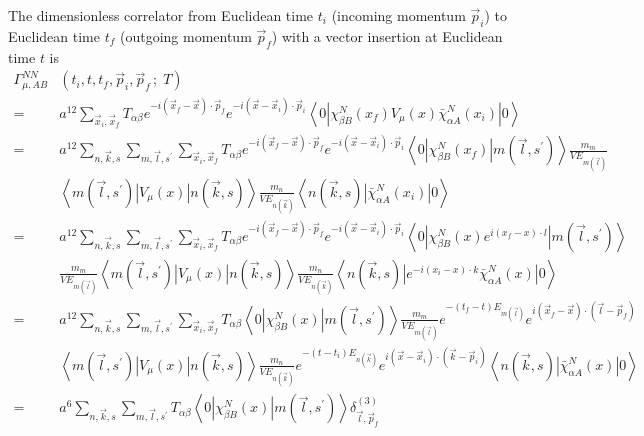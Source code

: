 \documentclass[12pt]{article}
\begin{document}
The dimensionless correlator from Euclidean time $t_i$ (incoming momentum
${\vec p}_i$) to Euclidean time $t_f$ (outgoing momentum $\vec{p}_f$) with a
vector insertion at Euclidean time $t$ is
\[
\begin{split}
\Gamma^{NN}_{\mu,AB}&(t_i,t,t_f,\vec{p}_i,\vec{p}_f\,;\;T) \\
  =\ & a^{12}\sum_{\vec{x}_i,\vec{x}_f} T_{\alpha\beta} 
     e^{-i(\vec{x}_f-\vec{x})\cdot\vec{p}_f}
     e^{-i(\vec{x}-\vec{x}_i)\cdot\vec{p}_i}
     \left<0\left|\chi^N_{\beta B}(x_f)V_\mu(x)\bar\chi^N_{\alpha A}(x_i)
     \right|0\right> \\
  =\ & a^{12}\sum_{n,\vec{k},s}\sum_{m,\vec{l},s^\prime}\sum_{\vec{x}_i,\vec{x}_f}
     T_{\alpha\beta} 
     e^{-i(\vec{x}_f-\vec{x})\cdot\vec{p}_f}
     e^{-i(\vec{x}-\vec{x}_i)\cdot\vec{p}_i}
     \left<0\left|\chi^N_{\beta B}(x_f)\right|m(\vec{l},s^\prime)\right>
     \frac{m_m}{VE_{m(\vec{l})}} \\
   & \left<m(\vec{l},s^\prime)\left|V_\mu(x)\right|n(\vec{k},s)\right>
     \frac{m_n}{VE_{n(\vec{k})}}
     \left<n(\vec{k},s)\left|\bar\chi^N_{\alpha A}(x_i)\right|0\right>
     \\
  =\ & a^{12}\sum_{n,\vec{k},s}\sum_{m,\vec{l},s^\prime}\sum_{\vec{x}_i,\vec{x}_f}
     T_{\alpha\beta} 
     e^{-i(\vec{x}_f-\vec{x})\cdot\vec{p}_f}
     e^{-i(\vec{x}-\vec{x}_i)\cdot\vec{p}_i}
     \left<0\left|\chi^N_{\beta B}(x)e^{i(x_f-x)\cdot l}\right|m(\vec{l},
     s^\prime)\right> \\
   & \frac{m_m}{VE_{m(\vec{l})}}
     \left<m(\vec{l},s^\prime)\left|V_\mu(x)\right|n(\vec{k},s)\right>
     \frac{m_n}{VE_{n(\vec{k})}}
     \left<n(\vec{k},s)\left|e^{-i(x_i-x)\cdot k}
     \bar\chi^N_{\alpha A}(x)\right|0\right> \\
  =\ & a^{12}\sum_{n,\vec{k},s}\sum_{m,\vec{l},s^\prime}\sum_{\vec{x}_i,\vec{x}_f}
     T_{\alpha\beta} 
     \left<0\left|\chi^N_{\beta B}(x)\right|m(\vec{l},s^\prime)\right>
     \frac{m_m}{VE_{m(\vec{l})}}e^{-(t_f-t)E_{m(\vec{l})}}
     e^{i(\vec{x}_f-\vec{x})\cdot(\vec{l}-\vec{p}_f)} \\
   & \left<m(\vec{l},s^\prime)\left|V_\mu(x)\right|n(\vec{k},s)\right>
     \frac{m_n}{VE_{n(\vec{k})}}e^{-(t-t_i)E_{n(\vec{k})}}
     e^{i(\vec{x}-\vec{x}_i)\cdot(\vec{k}-\vec{p}_i)}
     \left<n(\vec{k},s)\left|\bar\chi^N_{\alpha A}(x)\right|0\right>
     \\
  =\ & a^6\sum_{n,\vec{k},s}\sum_{m,\vec{l},s^\prime} T_{\alpha\beta} 
     \left<0\left|\chi^N_{\beta B}(x)\right|m(\vec{l},s^\prime)\right>
     \delta^{(3)}_{\vec{l},\vec{p}_f}

\end{split}\]
\end{document}
